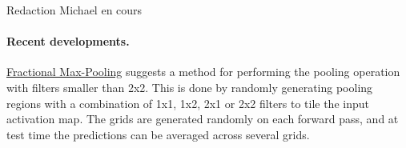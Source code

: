 {\color{red}Redaction Michael en cours}

\paragraph{Recent developments. }

\href{http://arxiv.org/abs/1412.6071}{Fractional Max-Pooling} suggests a method for performing the pooling operation with filters smaller than 2x2. This is done by randomly generating pooling regions with a combination of 1x1, 1x2, 2x1 or 2x2 filters to tile the input activation map. The grids are generated randomly on each forward pass, and at test time the predictions can be averaged across several grids.